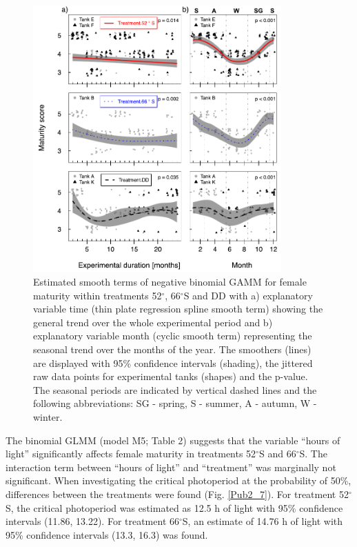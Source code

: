 \begin{figure}
        \centering
        \includegraphics[width=0.85\textwidth]{../Figures/Pub2_6.pdf}
        \caption{Estimated smooth terms of negative binomial GAMM for female
        maturity within treatments 52$^{\circ}$, 66$^{\circ}$S and DD with a)
        explanatory variable time (thin plate regression spline smooth term)
        showing the general trend over the whole experimental period and b)
        explanatory variable month (cyclic smooth term) representing the
        seasonal trend over the months of the year. The smoothers (lines) are
        displayed with 95\% confidence intervals (shading), the jittered raw
        data points for experimental tanks (shapes) and the p-value. The
        seasonal periods are indicated by vertical dashed lines and the
        following abbreviations: SG - spring, S - summer, A - autumn, W -
        winter.}
        \label{Pub2_6}
\end{figure}

The binomial GLMM (model M5; Table 2) suggests that the variable “hours of
light” significantly affects female maturity in treatments 52$^{\circ}$S and
66$^{\circ}$S. The interaction term between “hours of light” and “treatment”
was marginally not significant. When investigating the critical photoperiod at
the probability of 50\%, differences between the treatments were found (Fig.
\ref{Pub2_7}). For treatment 52$^{\circ}$S, the critical photoperiod was
estimated as 12.5 h of light with 95\% confidence intervals (11.86, 13.22). For
treatment 66$^{\circ}$S, an estimate of 14.76 h of light with 95\% confidence
intervals (13.3, 16.3) was found.


